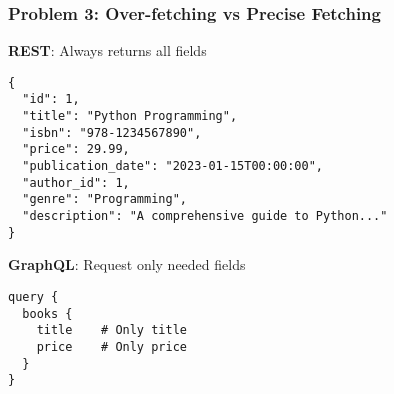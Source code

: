 \documentclass{article}
\begin{document}
\subsubsection{Problem 3: Over-fetching vs Precise Fetching}
\textbf{REST}: Always returns all fields
\begin{verbatim}
{
  "id": 1,
  "title": "Python Programming",
  "isbn": "978-1234567890",
  "price": 29.99,
  "publication_date": "2023-01-15T00:00:00",
  "author_id": 1,
  "genre": "Programming",
  "description": "A comprehensive guide to Python..."
}
\end{verbatim}
\textbf{GraphQL}: Request only needed fields
\begin{verbatim}
query {
  books {
    title    # Only title
    price    # Only price
  }
}
\end{verbatim}
\end{document}
